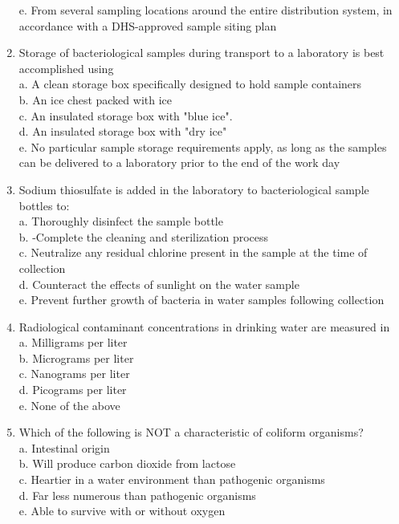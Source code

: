 \begin{enumerate}[1.]
e. From several sampling locations around the entire distribution system, in accordance with a DHS-approved sample siting plan\\
\item Storage of bacteriological samples during transport to a laboratory is best accomplished using\\
a. A clean storage box specifically designed to hold sample containers\\
b. An ice chest packed with ice\\
c. An insulated storage box with "blue ice".\\
d. An insulated storage box with "dry ice"\\
e. No particular sample storage requirements apply, as long as the samples can be delivered to a laboratory prior to the end of the work day\\
\item Sodium thiosulfate is added in the laboratory to bacteriological sample bottles to:\\
a. Thoroughly disinfect the sample bottle\\
b. -Complete the cleaning and sterilization process\\
c. Neutralize any residual chlorine present in the sample at the time of collection\\
d. Counteract the effects of sunlight on the water sample\\
e. Prevent further growth of bacteria in water samples following collection\\
\item Radiological contaminant concentrations in drinking water are measured in\\
a. Milligrams per liter\\
b. Micrograms per liter\\
c. Nanograms per liter\\
d. Picograms per liter\\
e. None of the above\\
\item Which of the following is NOT a characteristic of coliform organisms?\\
a. Intestinal origin\\
b. Will produce carbon dioxide from lactose\\
c. Heartier in a water environment than pathogenic organisms\\
d. Far less numerous than pathogenic organisms\\
e. Able to survive with or without oxygen\\

\end{enumerate}
